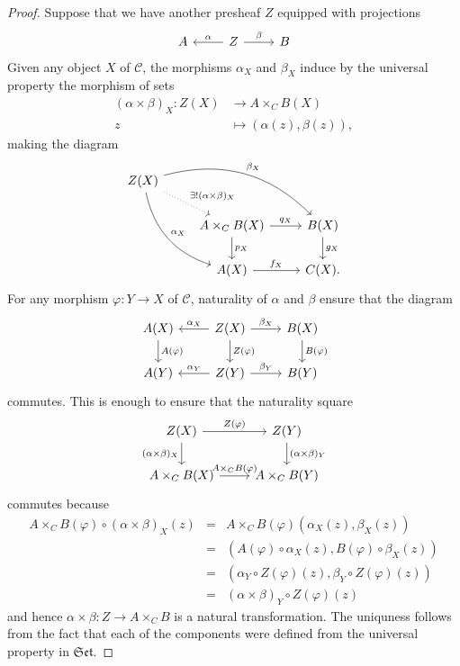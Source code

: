 \documentclass[dissertation.tex]{subfiles}
\begin{document}
\begin{prop}
\begin{proof}
    Suppose that we have another presheaf $Z$ equipped with projections
    $$\begin{tikzcd}
      A & Z \arrow{r}{\beta} \arrow[swap]{l}{\alpha} & B
    \end{tikzcd}$$
    Given any object $X$ of $\mathscr{C}$, the morphisms $\alpha_X$ and $\beta_X$ induce by the universal property the morphism of sets
    \begin{align*}
      (\alpha \times \beta)_X \colon Z(X) &\rightarrow A \times_C B(X)\\
      z &\mapsto (\alpha(z), \beta(z)),
    \end{align*}
    making the diagram
    $$\begin{tikzcd}
      Z(X)\arrow[bend left]{rrd}{\beta_X}\arrow[bend right]{rdd}{\alpha_X} \arrow[dotted]{rd}{\exists !(\alpha \times \beta)_X} \\
      & A \times_C B(X) \arrow{r}{q_X}\arrow{d}{p_X} & B(X)\arrow{d}{g_X}\\
      & A(X) \arrow{r}{f_X} & C(X).
    \end{tikzcd}$$
    For any morphism $\varphi \colon Y \rightarrow X$ of $\mathscr{C}$, naturality of $\alpha$ and $\beta$ ensure that the diagram
    $$\begin{tikzcd}
      A(X)\arrow{d}{A(\varphi)} & Z(X)\arrow[swap]{l}{\alpha_X}\arrow{r}{\beta_X}\arrow{d}{Z(\varphi)} & B(X)\arrow{d}{B(\varphi)}\\
      A(Y) & Z(Y)\arrow[swap]{l}{\alpha_Y}\arrow{r}{\beta_Y} & B(Y)
    \end{tikzcd}$$
    commutes.
    This is enough to ensure that the naturality square
    $$\begin{tikzcd}
      Z(X) \arrow[swap]{d}{(\alpha \times \beta)_X}\arrow{r}{Z(\varphi)}& Z(Y)\arrow{d}{(\alpha \times \beta)_Y}\\
      A \times_C B(X) \arrow{r}{A \times_C B(\varphi)} & A \times_C B(Y)
    \end{tikzcd}$$
    commutes because
    \begin{eqnarray*}
      A \times_C B (\varphi) \circ (\alpha \times \beta)_X(z) &=& A \times_C B (\varphi)(\alpha_X(z), \beta_X(z))\\
      &=& (A(\varphi) \circ \alpha_X(z), B(\varphi) \circ \beta_X(z))\\
      &=& (\alpha_Y \circ Z(\varphi)(z), \beta_Y \circ Z(\varphi)(z))\\
      &=& (\alpha \times \beta)_Y \circ Z(\varphi)(z)
    \end{eqnarray*}
    and hence $\alpha \times \beta \colon Z \rightarrow A \times_C B$ is a natural transformation.
    The uniquness follows from the fact that each of the components were defined from the universal property in $\mathfrak{Set}$.
  \end{proof}
\end{prop}
\end{document}
